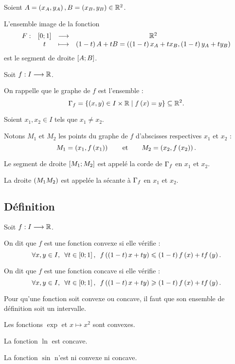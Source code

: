 \begin{rem}
Soient \(A=\left(x_A,y_A\right),B=\left(x_B,y_B\right)\in\mathbb{R}^2\).

L'ensemble image de la fonction \[\begin{array}[t]{cccc}F : & \left[0;1\right] & \longrightarrow & \mathbb{R}^2 \\ & t & \longmapsto & \left(1-t\right)A+tB=\left(\left(1-t\right)x_A+tx_B,\left(1-t\right)y_A+ty_B\right)\end{array}\] est le segment de droite \(\left[A;B\right]\).
\end{rem}

\begin{defi}
Soit \(f:I\longrightarrow\mathbb{R}\).

On rappelle que le graphe de \(f\) est l'ensemble : \[\Gamma_{f}=\left\lbrace\left(x,y\right)\in I\times\mathbb{R}\;\middle|\; f\left(x\right)=y\right\rbrace\subseteq\mathbb{R}^2.\]

Soient \(x_1,x_2\in I\) tels que \(x_1\not=x_2\).

Notons \(M_1\) et \(M_2\) les points du graphe de \(f\) d'abscisses respectives \(x_1\) et \(x_2\) : \[M_1=\left(x_1,f\left(x_1\right)\right)\qquad\text{et}\qquad M_2=\left(x_2,f\left(x_2\right)\right).\]

Le segment de droite \(\left[M_1;M_2\right]\) est appelé la corde de \(\Gamma_{f}\) en \(x_1\) et \(x_2\).

La droite \(\left(M_1M_2\right)\) est appelée la sécante à \(\Gamma_{f}\) en \(x_1\) et \(x_2\).
\end{defi}

\subsection{Définition}

\begin{defi}
Soit \(f:I\longrightarrow\mathbb{R}\).

On dit que \(f\) est une fonction convexe si elle vérifie : \[\quantifs{\forall x,y\in I;\forall t\in\intervii{0}{1}}f\paren{\paren{1-t}x+ty}\leq\paren{1-t}f\paren{x}+tf\paren{y}.\]

On dit que \(f\) est une fonction concave si elle vérifie : \[\quantifs{\forall x,y\in I;\forall t\in\intervii{0}{1}}f\paren{\paren{1-t}x+ty}\geq\paren{1-t}f\paren{x}+tf\paren{y}.\]
\end{defi}

\begin{rem}
Pour qu'une fonction soit convexe ou concave, il faut que son ensemble de définition soit un intervalle.
\end{rem}

\begin{ex}
Les fonctions \(\exp\) et \(x\mapsto x^2\) sont convexes.

La fonction \(\ln\) est concave.

La fonction \(\sin\) n'est ni convexe ni concave.
\end{ex}


